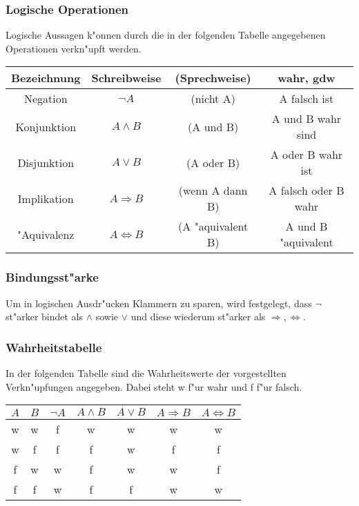 \documentclass{beamer}
\begin{document}
\begin{frame}
  \frametitle{Logische Operationen}
  Logische Aussagen k"onnen durch die in der folgenden Tabelle angegebenen Operationen verkn"upft werden.
  
  \begin{tabular}[h]{c|cc|c}
   
    Bezeichnung & Schreibweise & (Sprechweise) & wahr, gdw \\
    \hline
    Negation & $\neg A$ & (nicht A) & A falsch ist \\
    Konjunktion & $A\wedge B$ & (A und B) & A und B wahr sind \\
    Disjunktion & $A\vee B$ & (A oder B) & A oder B wahr ist \\
    Implikation & $A\Rightarrow B$ & (wenn A dann B) & A falsch oder B wahr \\
    "Aquivalenz & $A\Leftrightarrow B$ & (A "aquivalent B) & A und B "aquivalent 


    \end{tabular}
\end{frame}

\begin{frame}
  \frametitle{Bindungsst"arke}
  Um in logischen Ausdr"ucken Klammern zu sparen, wird festgelegt, dass $\neg$ st"arker bindet als $\wedge$ sowie $\vee$ und diese wiederum st"arker als $\Rightarrow, \Leftrightarrow$.
\end{frame}

\begin{frame}
  \frametitle{Wahrheitstabelle}
  In der folgenden Tabelle sind die Wahrheitswerte der vorgestellten Verkn"upfungen angegeben. Dabei steht w f"ur wahr und f f"ur falsch.
  \begin{tabular}[h]{c|c|c|c|c|c|c}
   
    $A$ & $B$ & $\neg A$ & $A\wedge B$ & $A\vee B$ & $A\Rightarrow B$ & $A\Leftrightarrow B$ \\
    \hline
    w & w & f & w & w & w & w \\
    w & f & f & f & w & f & f \\
    f & w & w & f & w & w & f \\
    f & f & w & f & f & w & w
    
  \end{tabular}
\end{frame}
\end{document}
